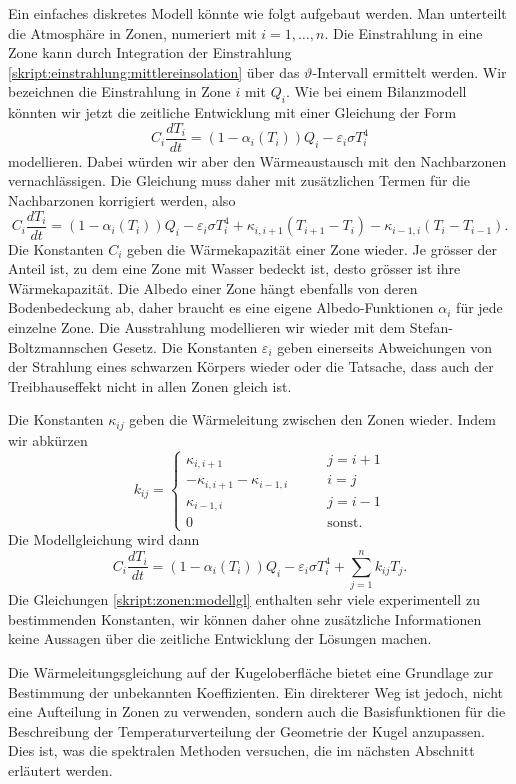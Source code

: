 Ein einfaches diskretes Modell könnte wie folgt aufgebaut werden.
Man unterteilt die Atmosphäre in Zonen, numeriert mit $i=1,\dots,n$.
Die Einstrahlung in eine Zone kann durch Integration der Einstrahlung
\eqref{skript:einstrahlung:mittlereinsolation}
über das $\vartheta$-Intervall ermittelt werden.
Wir bezeichnen die Einstrahlung in Zone $i$ mit $Q_i$.
Wie bei einem Bilanzmodell könnten wir jetzt die zeitliche
Entwicklung mit einer Gleichung der Form
\[
C_i\frac{dT_i}{dt}
=
(1-\alpha_i(T_i)) Q_i - \varepsilon_i \sigma T_i^4
\]
modellieren.
Dabei würden wir aber den Wärmeaustausch mit den Nachbarzonen
vernachlässigen.
Die Gleichung muss daher mit zusätzlichen Termen für die Nachbarzonen
korrigiert werden, also
\begin{equation}
C_i\frac{dT_i}{dt}
=
(1-\alpha_i(T_i)) Q_i - \varepsilon_i \sigma T_i^4
+
\kappa_{i,i+1} (T_{i+1}-T_i)
-
\kappa_{i-1,i} (T_i-T_{i-1}).
\end{equation}
Die Konstanten $C_i$ geben die Wärmekapazität einer Zone wieder.
Je grösser der Anteil ist, zu dem eine Zone mit Wasser bedeckt ist,
desto grösser ist ihre Wärmekapazität.
Die Albedo einer Zone hängt ebenfalls von deren Bodenbedeckung ab, 
daher braucht es eine eigene Albedo-Funktionen $\alpha_i$ für jede
einzelne Zone.
Die Ausstrahlung modellieren wir wieder mit dem Stefan-Boltzmannschen
Gesetz.
Die Konstanten $\varepsilon_i$ geben einerseits Abweichungen von
der Strahlung eines schwarzen Körpers wieder oder die Tatsache, dass
auch der Treibhauseffekt nicht in allen Zonen gleich ist.

Die Konstanten $\kappa_{ij}$ geben die Wärmeleitung zwischen den
Zonen wieder.
Indem wir abkürzen
\[
k_{ij}
=
\begin{cases}
\kappa_{i,i+1}&\qquad j=i+1
\\
-\kappa_{i,i+1}-\kappa_{i-1,i}&\qquad i=j
\\
\kappa_{i-1,i}&\qquad j=i-1
\\
0&\qquad\text{sonst.}
\end{cases}
\]
Die Modellgleichung wird dann
\begin{equation}
C_i \frac{dT_i}{dt}
=
(1-\alpha_i(T_i)) Q_i - \varepsilon_i \sigma T_i^4
+
\sum_{j=1}^n k_{ij}T_j.
\label{skript:zonen:modellgl}
\end{equation}
Die Gleichungen
\eqref{skript:zonen:modellgl}
enthalten sehr viele experimentell zu bestimmenden Konstanten,
wir können daher ohne zusätzliche Informationen keine Aussagen
über die zeitliche Entwicklung der Lösungen machen.

Die Wärmeleitungsgleichung auf der Kugeloberfläche bietet eine
Grundlage zur Bestimmung der unbekannten Koeffizienten.
Ein direkterer Weg ist jedoch, nicht eine Aufteilung in Zonen
zu verwenden, sondern auch die Basisfunktionen für die Beschreibung
der Temperaturverteilung der Geometrie der Kugel anzupassen.
Dies ist, was die spektralen Methoden versuchen, die im nächsten
Abschnitt erläutert werden.

